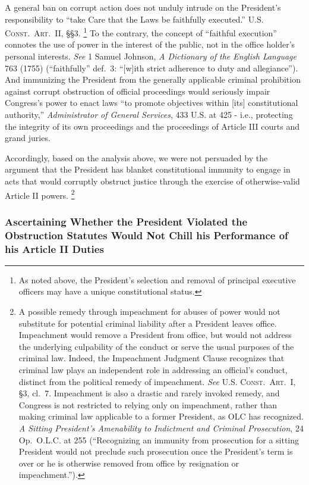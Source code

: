 A general ban on corrupt action does not unduly intrude on the President’s responsibility to “take Care that the Laws be faithfully executed.”
\textsc{U.S. Const.\ Art.~II}, \S\S 3.%
\footnote{As noted above, the President’s selection and removal of principal executive officers may have a unique constitutional status.}
To the contrary, the concept of “faithful execution” connotes the use of power in the interest of the public, not in the office holder’s personal interests.
\textit{See} 1 Samuel Johnson, \textit{A Dictionary of the English Language} 763 (1755) (“faithfully” def.~3: “[w]ith strict adherence to duty and allegiance”).
And immunizing the President from the generally applicable criminal prohibition against corrupt obstruction of official proceedings would seriously impair Congress’s power to enact laws “to promote objectives within [its] constitutional authority,” \textit{Administrator of General Services}, 433 U.S. at 425 - i.e., protecting the integrity of its own proceedings and the proceedings of Article III courts and grand juries.

Accordingly, based on the analysis above, we were not persuaded by the argument that the President has blanket constitutional immunity to engage in acts that would corruptly obstruct justice through the exercise of otherwise-valid Article II powers.%
\footnote{A possible remedy through impeachment for abuses of power would not substitute for potential criminal liability after a President leaves office.
Impeachment would remove a President from office, but would not address the underlying culpability of the conduct or serve the usual purposes of the criminal law.
Indeed, the Impeachment Judgment Clause recognizes that criminal law plays an independent role in addressing an official’s conduct, distinct from the political remedy of impeachment.
\textit{See} \textsc{U.S. Const.\ Art}.~I, \S 3, cl.~7.
Impeachment is also a drastic and rarely invoked remedy, and Congress is not restricted to relying only on impeachment, rather than making criminal law applicable to a former President, as OLC has recognized.
\textit{A Sitting President's Amenability to Indictment and Criminal Prosecution}, 24 Op.\ O.L.C. at 255 (“Recognizing an immunity from prosecution for a sitting President would not preclude such prosecution once the President’s term is over or he is otherwise removed from office by resignation or impeachment.”).}

\subsubsection{Ascertaining Whether the President Violated the Obstruction Statutes Would Not Chill his Performance of his Article II Duties}

